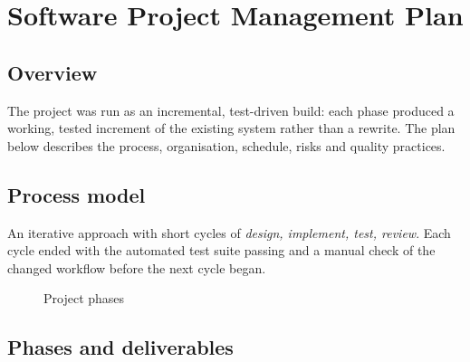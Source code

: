 \chapter{Software Project Management Plan}
\label{chap:plan}

\section{Overview}

The project was run as an incremental, test-driven build: each phase produced a working, tested increment of the existing system rather than a rewrite. The plan below describes the process, organisation, schedule, risks and quality practices.

\section{Process model}

An iterative approach with short cycles of \emph{design, implement, test, review}. Each cycle ended with the automated test suite passing and a manual check of the changed workflow before the next cycle began.

\begin{figure}[H]
\centering
{}
\caption{Project phases}
\end{figure}

\section{Phases and deliverables}

